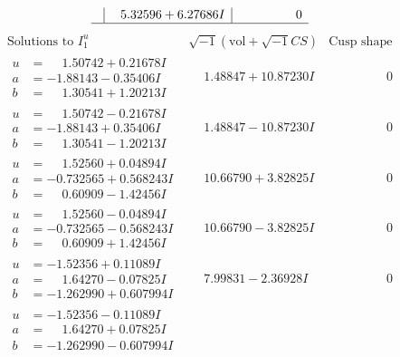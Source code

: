 \documentclass[1p]{elsarticle_modified}
\theoremstyle{definition}
\newcommand{\I}{\sqrt{-1}}
\begin{document}
$$\begin{array}{c|c|c}
 & \phantom{-}5.32596 + 6.27686 I & \phantom{-0.000000 } 0\\
 \hline 
 \end{array}$$\newpage$$\begin{array}{c|c|c}  
\text{Solutions to }I^u_{1}& \I (\text{vol} + \sqrt{-1}CS) & \text{Cusp shape}\\
 \hline 
\begin{aligned}
u &= \phantom{-}1.50742 + 0.21678 I \\
a &= -1.88143 - 0.35406 I \\
b &= \phantom{-}1.30541 + 1.20213 I\end{aligned}
 & \phantom{-}1.48847 + 10.87230 I & \phantom{-0.000000 } 0 \\ \hline\begin{aligned}
u &= \phantom{-}1.50742 - 0.21678 I \\
a &= -1.88143 + 0.35406 I \\
b &= \phantom{-}1.30541 - 1.20213 I\end{aligned}
 & \phantom{-}1.48847 - 10.87230 I & \phantom{-0.000000 } 0 \\ \hline\begin{aligned}
u &= \phantom{-}1.52560 + 0.04894 I \\
a &= -0.732565 + 0.568243 I \\
b &= \phantom{-}0.60909 - 1.42456 I\end{aligned}
 & \phantom{-}10.66790 + 3.82825 I & \phantom{-0.000000 } 0 \\ \hline\begin{aligned}
u &= \phantom{-}1.52560 - 0.04894 I \\
a &= -0.732565 - 0.568243 I \\
b &= \phantom{-}0.60909 + 1.42456 I\end{aligned}
 & \phantom{-}10.66790 - 3.82825 I & \phantom{-0.000000 } 0 \\ \hline\begin{aligned}
u &= -1.52356 + 0.11089 I \\
a &= \phantom{-}1.64270 - 0.07825 I \\
b &= -1.262990 + 0.607994 I\end{aligned}
 & \phantom{-}7.99831 - 2.36928 I & \phantom{-0.000000 } 0 \\ \hline\begin{aligned}
u &= -1.52356 - 0.11089 I \\
a &= \phantom{-}1.64270 + 0.07825 I \\
b &= -1.262990 - 0.607994 I\end{aligned}

\end{array}$$
\end{document}
